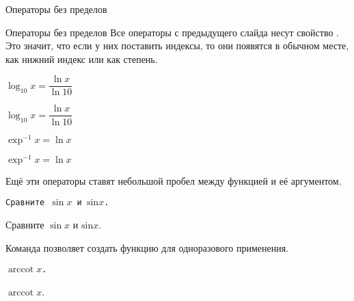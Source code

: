 \begin{frame}{Операторы без пределов}
	\Large
	\begin{center}
		
	\end{center}
\end{frame}

\begin{frame}{Операторы без пределов}
	Все операторы с предыдущего слайда несут свойство \texttt{\nolimits}. Это значит, что если у них поставить индексы, то они появятся в обычном месте, как нижний индекс или как степень.
	
	\begin{minipage}{0.49\textwidth}
		\texttt{$\log_{10} x =  \dfrac{\ln x}{\ln 10}$}
	\end{minipage}
	\begin{minipage}{0.49\textwidth}
		\begin{center}
			\Large
			$\log_{10} x =  \dfrac{\ln x}{\ln 10}$
		\end{center}
	\end{minipage}

	\begin{minipage}{0.49\textwidth}
		\texttt{$\exp^{-1}x =  \ln x$}
	\end{minipage}
	\begin{minipage}{0.49\textwidth}
		\begin{center}
			\Large
			$\exp^{-1}x =  \ln x$
		\end{center}
	\end{minipage}

	Ещё эти операторы ставят небольшой пробел между функцией и её аргументом.
	
	\begin{minipage}{0.49\textwidth}
		\texttt{Сравните $\sin x$ и $\mathrm{sin}x$.}
	\end{minipage}
	\begin{minipage}{0.49\textwidth}
		\begin{center}
			\Large
			Сравните $\sin x$ и $\mathrm{sin}x$.
		\end{center}
	\end{minipage}
	
	Команда \texttt{\operatorname} позволяет создать функцию для одноразового применения.
	
	\begin{minipage}{0.49\textwidth}
		\texttt{$\operatorname{arccot}x$.}
	\end{minipage}
	\begin{minipage}{0.49\textwidth}
		\begin{center}
			\Large
			$\operatorname{arccot}x$.
		\end{center}
	\end{minipage}
\end{frame}

